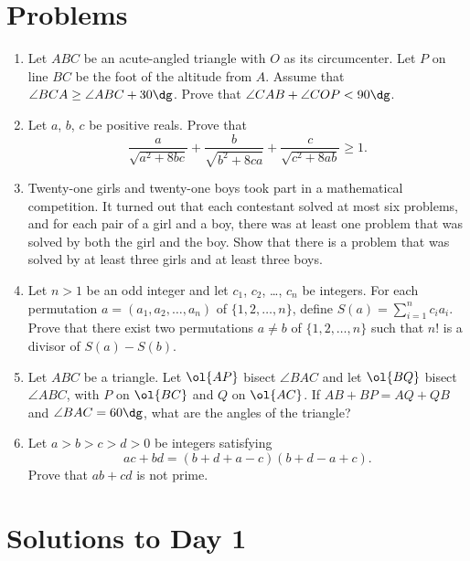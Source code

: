 \documentclass[11pt]{scrartcl}
\begin{document}
\section{Problems}
\begin{enumerate}[\bfseries 1.]
\item %
Let $ABC$ be an acute-angled triangle with $O$ as its circumcenter.
Let $P$ on line $BC$ be the foot of the altitude from $A$.
Assume that $\angle BCA \ge \angle ABC + 30\dg$.
Prove that $\angle CAB + \angle COP < 90\dg$.

\item %
Let $a$, $b$, $c$ be positive reals. Prove that
\[ \frac{a}{\sqrt{a^2+8bc}} + \frac{b}{\sqrt{b^2+8ca}} + \frac{c}{\sqrt{c^2+8ab}} \ge 1. \]

\item %
Twenty-one girls and twenty-one boys took part in a mathematical competition.
It turned out that each contestant solved at most six problems,
and for each pair of a girl and a boy,
there was at least one problem that was solved by both the girl and the boy.
Show that there is a problem that was solved by at least three girls and at least three boys.

\item %
Let $n > 1$ be an odd integer and let $c_1$, $c_2$, \dots, $c_n$ be integers.
For each permutation $a = (a_1, a_2, \dots, a_n)$
of $\{1,2,\dots,n\}$, define $S(a) = \sum_{i=1}^n c_i a_i$.
Prove that there exist two permutations $a \neq b$
of $\{1,2,\dots,n\}$ such that $n!$ is a divisor of $S(a)-S(b)$.

\item %
Let $ABC$ be a triangle.
Let $\ol{AP}$ bisect $\angle BAC$ and let $\ol{BQ}$ bisect $\angle ABC$,
with $P$ on $\ol{BC}$ and $Q$ on $\ol{AC}$.
If $AB + BP = AQ + QB$ and $\angle BAC = 60\dg$,
what are the angles of the triangle?

\item %
Let $a > b > c > d > 0$ be integers satisfying
\[ ac + bd = (b+d+a-c)(b+d-a+c).  \]
Prove that $ab + cd$ is not prime.

\end{enumerate}
\pagebreak

\section{Solutions to Day 1}
\end{document}
